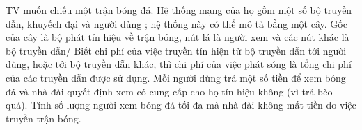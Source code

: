 TV muốn chiếu một trận bóng đá. Hệ thống mạng của họ gồm một số bộ  truyền dẫn, khuyếch đại và người dùng ; hệ thống này có thể mô tả bằng  một cây.    Gốc của cây là bộ phát tín hiệu về trận bóng, nút lá là người xem và các  nút khác là bộ truyền dẫn/ Biết chi phí của việc truyền tín hiện từ bộ truyền dẫn tới người dùng,  hoặc tới bộ truyền dẫn khác, thì chi phí của việc phát sóng là tổng chi phí  của các truyền dẫn được sử dụng. Mỗi người dùng trả một số tiền để xem bóng đá và nhà đài quyết định xem có  cung cấp cho họ tín hiệu không (vì trả bèo quá). Tính số lượng người xem bóng đá tối đa mà nhà đài không mất tiền do  việc truyền trận bóng.  

\